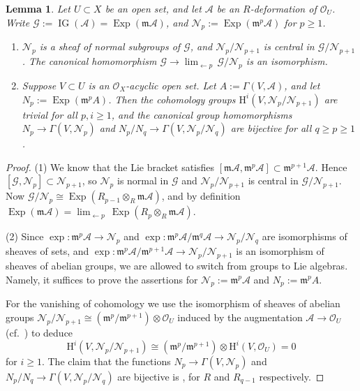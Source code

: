 \documentclass[a4paper, 10pt]{amsart}
\newtheorem{lem}[equation]{Lemma}
\theoremstyle{definition}
\numberwithin{equation}{section}
\newcommand{\opn}{\operatorname}
\newcommand{\mfrak}[1]{\mathfrak{#1}}
\newcommand{\mcal}[1]{\mathcal{#1}}
\newcommand{\mrm}[1]{\mathrm{#1}}
\newcommand{\ot}{\otimes}
\newcommand{\OO}{\mcal{O}}
\renewcommand{\AA}{\mcal{A}}
\newcommand{\m}{\mfrak{m}}
\begin{document}
\begin{lem} \label{lem:mdd.101}
Let $U \subset X$ be an open set, and let
$\mcal{A}$ be an  $R$-deformation of $\mcal{O}_U$. Write
$\mcal{G} := \opn{IG}(\mcal{A}) = \opn{Exp} (\m \mcal{A})$,
and $\mcal{N}_p := \opn{Exp} (\m^{p} \mcal{A})$ for $p \geq 1$.
\begin{enumerate}
\item $\mcal{N}_p$ is a sheaf of normal subgroups of $\mcal{G}$, and
$\mcal{N}_p / \mcal{N}_{p+1}$ is central in $\mcal{G} / \mcal{N}_{p+1}$.
The canonical homomorphism 
$\mcal{G} \to \lim_{\leftarrow p}\, \mcal{G} / \mcal{N}_p$
is an isomorphism.

\item Suppose $V \subset U$ is an $\mcal{O}_X$-acyclic open set. 
Let $A := \Gamma(V, \mcal{A})$, and let
$N_p := \opn{Exp}(\m^{p} A)$. Then the cohomology groups 
$\mrm{H}^i(V, \mcal{N}_p / \mcal{N}_{p+1})$ are
trivial for all $p, i \geq 1$, and the canonical group homomorphisms 
$N_p \to \Gamma(V, \mcal{N}_p)$
and
$N_p / N_{q} \to \Gamma(V, \mcal{N}_p / \mcal{N}_{q})$
are bijective for all $q \geq p \geq 1$.
\end{enumerate}
\end{lem}

\begin{proof}
(1) We know that the Lie bracket satisfies 
$[\m \mcal{A}, \m^{p} \mcal{A}] \subset \m^{p+1} \mcal{A}$.
Hence $[ \mcal{G} , \mcal{N}_{p} ] \subset \mcal{N}_{p+1}$, 
so $\mcal{N}_{p}$ is normal in $\mcal{G}$ and 
$\mcal{N}_p / \mcal{N}_{p+1}$ is central in $\mcal{G} / \mcal{N}_{p+1}$.
Now $\mcal{G} / \mcal{N}_{p} \cong \opn{Exp}(R_{p-1} \ot_R \m \mcal{A})$,
and by definition 
$\opn{Exp} (\m \mcal{A}) = \lim_{\leftarrow p}\,
\opn{Exp}(R_{p} \ot_R \m \mcal{A})$.

\medskip \noindent
(2) Since $\opn{exp} : \m^{p} \mcal{A} \to \mcal{N}_p$
and
$\opn{exp} : \m^{p} \mcal{A} / \m^{q} \mcal{A} \to 
\mcal{N}_p / \mcal{N}_q$
are isomorphisms of sheaves of sets, and  
$\opn{exp} : \m^{p}  \mcal{A} / \m^{p+1} \mcal{A} \to 
\mcal{N}_p / \mcal{N}_{p+1}$
is an isomorphism of sheaves of abelian groups, we are allowed to switch 
from groups to Lie algebras. Namely, it suffices to prove the assertions 
for $\mcal{N}_p := \m^{p} \mcal{A}$ and $N_p := \m^{p} A$.

For the vanishing of cohomology we use the isomorphism
of sheaves of abelian groups
$\mcal{N}_p / \mcal{N}_{p+1} \cong 
(\m^{p} / \m^{p+1}) \ot \mcal{O}_U$
induced by the augmentation $\AA \to \OO_U$ 
(cf.\ \cite[Proposition 5.3]{Ye5}) to deduce
\[ \mrm{H}^i(V, \mcal{N}_p / \mcal{N}_{p+1}) \cong
(\m^{p} / \m^{p+1}) \ot \mrm{H}^i(V, \mcal{O}_U) = 0 \]
for $i \geq 1$.
The claim that the functions
$N_p \to \Gamma(V, \mcal{N}_p)$
and
$N_p / N_{q} \to \Gamma(V, \mcal{N}_p / \mcal{N}_{q})$
are bijective is  \cite[Corollary 3.6]{Ye9}, for $R$ and
$R_{q-1}$ respectively. 
\end{proof}
\end{document}
